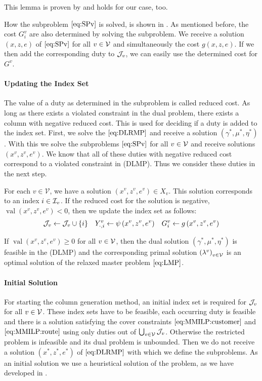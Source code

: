 This lemma is proven by \cite[pp.~42-43]{Kaiser} and holds for our case, too.

How the subproblem $\eqref{eq:SPv}$ is solved, is shown in . As mentioned before, the cost $G^v_i$ are also determined by solving the subproblem. We receive a solution $(x,z,e)$ of $\eqref{eq:SPv}$ for all $v\in\mathcal{V}$ and simultaneously the cost $g(x,z,e)$. If we then add the corresponding duty to $\mathcal{J}_v$, we can easily use the determined cost for $G^v$.

\paragraph{Updating the Index Set} \parfill

The value of a duty as determined in the subproblem is called reduced cost. As long as there exists a violated constraint in the dual problem, there exists a column with negative reduced cost. This is used for deciding if a duty is added to the index set. First, we solve the $\eqref{eq:DLRMP}$ and receive a solution $\left(\gamma^*,\mu^*,\eta^*\right)$. With this we solve the subproblems $\eqref{eq:SPv}$ for all $v\in\mathcal{V}$ and receive solutions $\left(x^v,z^v,e^v\right)$. We know that all of these duties with negative reduced cost correspond to a violated constraint in (DLMP). Thus we consider these duties in the next step. 

For each $v\in\mathcal{V}$, we have a solution ${\left(x^v,z^v,e^v\right)\in X_v}$. This solution corresponds to an index ${i\in\mathcal{I}_v}$. If the reduced cost for the solution is negative, \ie $\operatorname{val}\left(x^v,z^v,e^v\right)<0$, then we update the index set as follows:
\begin{align*}
	\mathcal{J}_v\gets\mathcal{J}_v\cup\{i\} && Y^v_{\cdot,i}\gets\psi\left(x^v,z^v,e^v\right) && G^v_i\gets g\left(x^v,z^v,e^v\right)
\end{align*}

If $\operatorname{val}\left(x^v,z^v,e^v\right)\geq 0$ for all $v\in\mathcal{V}$, then the dual solution $\left(\gamma^*,\mu^*,\eta^*\right)$ is feasible in the (DLMP) and the corresponding primal solution $\left(\lambda^v\right)_{v\in\mathcal{V}}$ is an optimal solution of the relaxed master problem $\eqref{eq:LMP}$.

\paragraph{Initial Solution} \parfill

For starting the column generation method, an initial index set is required for $\mathcal{J}_v$ for all $v\in\mathcal{V}$. These index sets have to be feasible, \ie each occurring duty is feasible and there is a solution satisfying the cover constraints $\eqref{eq:MMILP:customer}$ and $\eqref{eq:MMILP:route}$ using only duties out of $\bigcup_{v\in\mathcal{V}}\mathcal{J}_v$. Otherwise the restricted problem is infeasible and its dual problem is unbounded. Then we do not receive a solution $\left(x^*,z^*,e^*\right)$ of $\eqref{eq:DLRMP}$ with which we define the subproblems. As an initial solution we use a heuristical solution of the problem, as we have developed in .

